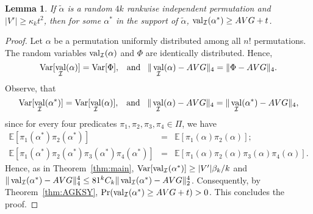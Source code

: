 \documentclass[11pt]{article}
\DeclareMathOperator {\val}  {val}
\DeclareMathOperator {\Var}  {Var}
\newcommand {\Exp}       {\mathbb{E}}
\newcommand {\E}     [1] {\Exp\left[#1\right]}
\newcommand {\calI}    {{\cal I}}
\newtheorem{lemma}[theorem]{Lemma}
\begin{document}
\begin{lemma}\label{lem:rankwise}
If $\tilde{\alpha}$ is a random $4k$ rankwise independent permutation and $|V'|\geq \kappa_k t^2$, then for some $\alpha^*$ in the
support of $\tilde{\alpha}$, $\val_{\calI}(\alpha^*)\geq AVG + t$.
\end{lemma}
\begin{proof}
Let $\alpha$ be a permutation uniformly distributed among all $n!$ permutations. The random variables $\val_{\calI}(\alpha)$ and $\Phi$
are identically distributed. Hence,
$$\Var[\val_{\calI}(\alpha)] = \Var[\Phi],\;\;\; \text{and}\;\;\;
\|\val_{\calI}(\alpha)- AVG\|_4 = \|\Phi - AVG\|_4.$$ Observe, that
$$\Var[\val_{\calI}(\alpha^*)] = \Var[\val_{\calI}(\alpha)],\;\;\; \text{and}\;\;\;
\|\val_{\calI}(\alpha)- AVG\|_4 = \|\val_{\calI}(\alpha^*)- AVG\|_4,$$
since for every four predicates $\pi_1,\pi_2,\pi_3,\pi_4\in \Pi$, we have
\begin{eqnarray*}
\E{\pi_1(\alpha^*)\pi_2(\alpha^*)} &=& \E{\pi_1(\alpha)\pi_2(\alpha)};\\
\E{\pi_1(\alpha^*)\pi_2(\alpha^*)\pi_3(\alpha^*)\pi_4(\alpha^*)} &=& \E{\pi_1(\alpha)\pi_2(\alpha)\pi_3(\alpha)\pi_4(\alpha)}.
\end{eqnarray*}
Hence, as in Theorem~\ref{thm:main}, $\Var[\val_{\calI}(\alpha^*)]\geq |V'|\beta_k/k$ and
$\|\val_{\calI}(\alpha^*) - AVG\|_4^4 \leq 81^k C_k \|\val_{\calI}(\alpha^*) - AVG\|_2^4$.
Consequently, by Theorem~\ref{thm:AGKSY}, $\Pr (\val_{\calI}(\alpha^*)\geq AVG + t) > 0$.
This concludes the proof.
\end{proof}
\end{document}
